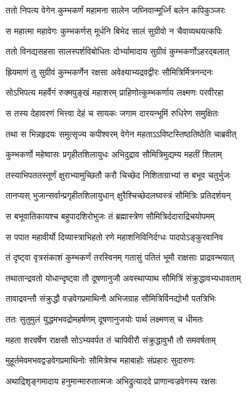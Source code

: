 \twolineshloka
{ततो निपत्य वेगेन कुम्भकर्णं महामना}
{सालेन जघ्निवान्मूर्ध्निं बलेन कपिकुञ्जरः}


\twolineshloka
{स महात्मा महावेगः कुम्भकर्णस् मूर्धनि}
{बिभेद सालं सुग्रीवो न चैवाव्यथयत्कपिः}


\twolineshloka
{ततो विनद्यसहसा सालस्पर्शविबोधितः}
{दोर्भ्यामादाय सुग्रीवं कुम्भकर्णोऽहरद्बलात्}


\twolineshloka
{ह्रियमाणं तु सुग्रीवं कुम्भकर्णेन रक्षसा}
{अवेक्ष्याभ्यद्रवद्वीरः सौमित्रिर्मित्रनन्दनः}


\twolineshloka
{सोऽभिपत्य महर्वेगं रुक्मपुङ्खं महाशरम्}
{प्राहिणोत्कुम्भकर्णाय लक्ष्मणः परवीरहा}


\twolineshloka
{स तस्य देहावरणं भित्त्वा देहं च सायकः}
{जगाम दारयन्भूमिं रुधिरेण समुक्षितः}


\twolineshloka
{तथा स भिन्नहृदयः समुत्सृज्य कपीश्वरम्}
{वेगेन महताऽऽविष्टस्तिष्ठतिष्ठेति चाब्रवीत्}


\twolineshloka
{कुम्भकर्णो महेष्वासः प्रगृहीतशिलायुधः}
{अभिदुद्राव सौमित्रिमुद्यम्य महतीं शिलाम्}


\twolineshloka
{तस्याभिपततस्तूर्णं क्षुराभ्यामुच्छितौ करौ}
{चिच्छेद निशिताग्राभ्यां स बभूव चतुर्भुजः}


\twolineshloka
{तानप्यस् भुजान्सर्वान्प्रगृहीतशिलायुधान्}
{क्षुरैश्चिच्छेदलघ्वस्त्रं सौमित्रिः प्रतिदर्शयन्}


\twolineshloka
{स बभूवातिकायश्च बहुपादशिरोभुजः}
{तं ब्रह्मास्त्रेण सौमित्रिर्ददाराद्रिचयोपमम्}


\twolineshloka
{स पपात महावीर्यो दिव्यास्त्राभिहतो रणे}
{महाशनिविनिर्दग्धः पादपोऽङ्कुरवानिव}


\twolineshloka
{तं दृष्ट्वा वृत्रसंकाशं कुम्भकर्णं तरस्विनम्}
{गतासुं पतितं भूमौ राक्षसाः प्राद्रवन्भयात्}


\twolineshloka
{तथातान्द्रवतो योधान्दृष्ट्वा तौ दूषणानुजौ}
{अवस्थाप्याथ सौमित्रिं संक्रुद्धावभ्यधावताम्}


\twolineshloka
{तावाद्रवन्तौ संक्रुद्धौ वज्रवेगप्रमाथिनौ}
{अभिजग्राह सौमित्रिर्विनद्योभौ पतत्रिभिः}


\twolineshloka
{ततः सुतुमुलं युद्धमभवद्रोमहर्षणम्}
{दूषणानुजयोः पार्थ लक्ष्मणस् च धीमतः}


\twolineshloka
{महता शरवर्षेण राक्षसौ सोऽभ्यवर्पत}
{तं चापिवीरौ संक्रुद्धावुभौ तौ समवर्षताम्}


\twolineshloka
{मुहूर्तमेवमभवद्वज्रवेगप्रमाथिनोः}
{सौमित्रेश्च महाबाहोः संप्रहारः सुदारुणः}


\twolineshloka
{अथाद्रिशृङ्गमादाय हनुमान्मारुतात्मजः}
{अभिद्रुत्याददे प्राणान्वज्रवेगस्य रक्षसः}


